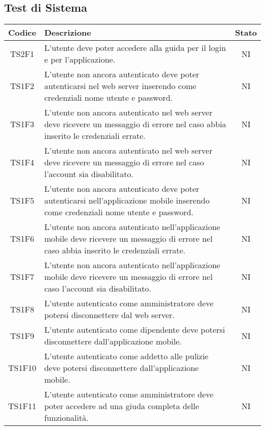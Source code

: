 	\subsection{Test di Sistema}
	\begin{center}
		\begin{longtable}{|c|p{10cm}|c|}
			\hline
			\rowcolor{lighter-grayer}
			\textbf{Codice} & \textbf{Descrizione} & \textbf{Stato}  \\ 
						
			\hline
			\endhead
			
			\hline
			TS2F1 & L'utente deve poter accedere alla guida per il login e per l'applicazione. & NI \\
			\hline
			TS1F2 &  L'utente non ancora autenticato deve poter autenticarsi nel web server inserendo come credenziali nome utente e password.  & NI \\			
			\hline
			TS1F3 & L'utente non ancora autenticato nel web server deve ricevere un messaggio di errore nel caso abbia inserito le credenziali errate. & NI \\			
			\hline
			TS1F4 & L'utente non ancora autenticato nel web server deve ricevere un messaggio di errore nel caso l'account sia disabilitato. & NI \\			
			\hline
			TS1F5 & L'utente non ancora autenticato deve poter autenticarsi nell'applicazione mobile inserendo come credenziali nome utente e password. & NI \\			
			\hline
			TS1F6 & L'utente non ancora autenticato nell'applicazione mobile deve ricevere un messaggio di errore nel caso abbia inserito le credenziali errate. & NI \\			
			\hline
			TS1F7 & L'utente non ancora autenticato nell'applicazione mobile deve ricevere un messaggio di errore nel caso l'account sia disabilitato. & NI \\			
			\hline
			TS1F8 & L'utente autenticato come amministratore deve potersi disconnettere dal web server. & NI \\			
			\hline
			TS1F9 & L'utente autenticato come dipendente deve potersi disconnettere dall'applicazione mobile. & NI \\			
			\hline			
			TS1F10 & L'utente autenticato come addetto alle pulizie deve potersi disconnettere dall'applicazione mobile. & NI \\			
			\hline
			TS1F11 & L'utente autenticato come amministratore deve poter accedere ad una giuda completa delle funzionalità. & NI \\		

\end{longtable}
\end{center}
